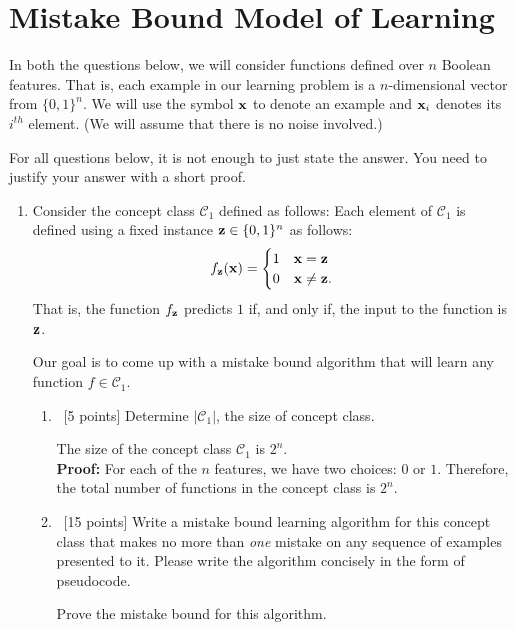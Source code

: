 \section{Mistake Bound Model of Learning}\label{sec:q3}

In both the questions below, we will consider functions defined over
$n$ Boolean features. That is, each example in our learning problem
is a $n$-dimensional vector from $\{0, 1\}^n$. We will use the
symbol ${\bf x}$ to denote an example and ${\bf x}_i$ denotes its $i^{th}$
element.  (We will assume that there is no noise involved.)

For all questions below, it is not enough to just state the
answer. You need to justify your answer with a short proof.


\begin{enumerate}
\item Consider the concept class $\mathcal{C}_1$ defined as follows:
  Each element of $\mathcal{C}_1$ is defined using a fixed instance
  ${\bf z} \in \{0, 1\}^n$ as follows:
  \begin{equation*}
    f_{\bf z}({\bf x}) = \begin{cases}
      1 & {\bf x} = {\bf z} \\
      0 & {\bf x} \ne {\bf z}.
    \end{cases}
  \end{equation*}
  That is, the function $f_{\bf z}$ predicts $1$ if, and only if, the
  input to the function is ${\bf z}$.

  Our goal is to come up with a mistake bound algorithm that will
  learn any function $f\in\mathcal{C}_1$.

  \begin{enumerate}
  \item~[5 points] Determine $\vert\mathcal{C}_1\vert$, the size of
    concept class.

  {\color{red}
    The size of the concept class $\mathcal{C}_1$ is $2^n$.\\
    \textbf{Proof:} For each of the $n$ features, we have two choices: $0$ or $1$. Therefore, the total number of functions in the concept class is $2^n$.
  }

  \item~[15 points] Write a mistake bound learning algorithm for
    this concept class that makes no more than {\em one} mistake on
    any sequence of examples presented to it. Please write the
    algorithm concisely in the form of pseudocode.

    Prove the mistake bound for this algorithm.


\end{enumerate}
\end{enumerate}
